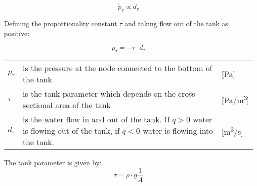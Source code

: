 \begin{equation} \label{eq:dotp prop dt}
	\dot{p}_{\tau} \propto d_\tau 
\end{equation}

Defining the proportionality constant $\tau$ and taking flow out of the tank as positive:

\begin{equation} \label{eq:dpTank}
	\dot{p}_{\tau}=-\tau \cdot d_{\tau} 
\end{equation} 

\begin{center}
	\begin{tabular}{l p{10cm} l}
		$p_\tau$ & is the pressure at the node connected to the bottom of the tank & [\si{Pa}]\\
		$\tau$ & is the tank parameter which depends on the cross sectional area of the tank & [\si{Pa}/\si{m\cubed}]\\
		$d_\tau$ & is the water flow in and out of the tank. If $q > 0$ water is flowing out of the tank, if $q < 0$ water is flowing into the tank. & [\si{m\cubed}/\si{s}] 
		\end{tabular}
\end{center}

The tank parameter is given by:
\begin{equation}\label{eq:TankParameter}
\tau = \rho \cdot g \frac{1}{A}
\end{equation}
 

